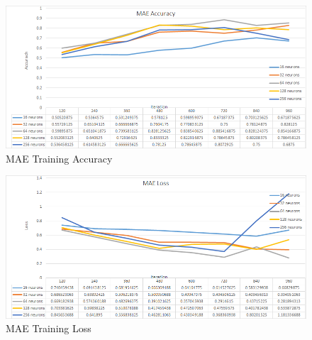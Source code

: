 \documentclass[draft,dvipsnames]{drexel-thesis}
\begin{document}
\begin{thesis}


\begin{figure}[t!]
    \centering
    \includegraphics[width=\textwidth]{pictures/result_pictures/MAE_Accuracy.png}
    \caption{MAE Training Accuracy}
    \label{fig:mae_accuracy}
\end{figure}

\begin{figure}[t!]
    \centering
    \includegraphics[width=\textwidth]{pictures/result_pictures/MAE_Loss.png}
    \caption{MAE Training Loss}
    \label{fig:mae_loss}
\end{figure}


\end{thesis}
\end{document}
